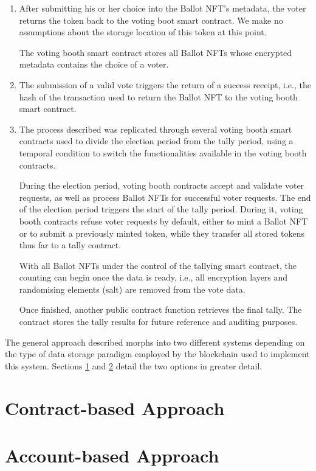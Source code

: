 \documentclass[../main.tex]{subfiles}
\begin{document}
\begin{enumerate}
    \item{After submitting his or her choice into the Ballot NFT's metadata, the voter returns the token back to the voting boot smart contract. We make no assumptions about the storage location of this token at this point.
          \par
          The voting booth smart contract stores all Ballot NFTs whose encrypted metadata contains the choice of a voter.}

    \item{The submission of a valid vote triggers the return of a success receipt, i.e., the hash of the transaction used to return the Ballot NFT to the voting booth smart contract.}

    \item{The process described was replicated through several voting booth smart contracts used to divide the election period from the tally period, using a temporal condition to switch the functionalities available in the voting booth contracts.
          \par
          During the election period, voting booth contracts accept and validate voter requests, as well as process Ballot NFTs for successful voter requests. The end of the election period triggers the start of the tally period. During it, voting booth contracts refuse voter requests by default, either to mint a Ballot NFT or to submit a previously minted token, while they transfer all stored tokens thus far to a tally contract.
          \par
          With all Ballot NFTs under the control of the tallying smart contract, the counting can begin once the data is ready, i.e., all encryption layers and randomising elements (salt) are removed from the vote data.
          \par
          Once finished, another public contract function retrieves the final tally. The contract stores the tally results for future reference and auditing purposes.}
\end{enumerate}

The general approach described morphs into two different systems depending on the type of data storage paradigm employed by the blockchain used to implement this system. Sections \ref{sec:contract-based-approach} and \ref{sec:account-based-approach} detail the two options in greater detail.

\section{Contract-based Approach}
\label{sec:contract-based-approach}


\section{Account-based Approach}
\label{sec:account-based-approach}

\end{document}
